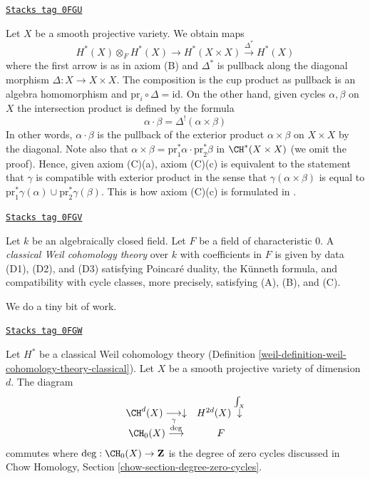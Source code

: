 \begin{remark}
\label{weil-remark-replace-cup-product-classical}
\href{https://stacks.math.columbia.edu/tag/0FGU}{\texttt{Stacks tag 0FGU}}

Let $X$ be a smooth projective variety. We obtain maps
$$
H^*(X) \otimes_F H^*(X) \longrightarrow H^*(X \times X)
\xrightarrow{\Delta^*} H^*(X)
$$
where the first arrow is as in axiom (B) and $\Delta^*$
is pullback along the diagonal morphism $\Delta : X \to X \times X$.
The composition is the cup product as pullback is an algebra homomorphism and
$\text{pr}_i \circ \Delta = \text{id}$.
On the other hand, given cycles $\alpha, \beta$ on $X$
the intersection product is defined by the formula
$$
\alpha \cdot \beta =
\Delta^!(\alpha \times \beta)
$$
In other words, $\alpha \cdot \beta$ is the pullback of the
exterior product $\alpha \times \beta$ on $X \times X$ by
the diagonal. Note also that
$\alpha \times \beta = \text{pr}_1^*\alpha \cdot \text{pr}_2^*\beta$
in $\CH^*(X \times X)$ (we omit the proof). Hence, given axiom (C)(a),
axiom (C)(c) is equivalent to the statement that $\gamma$ is
compatible with exterior product in the sense that
$\gamma(\alpha \times \beta)$ is equal to
$\text{pr}_1^*\gamma(\alpha) \cup \text{pr}_2^*\gamma(\beta)$.
This is how axiom (C)(c) is formulated in \cite{Kleiman-cycles}.
\end{remark}

\begin{definition}
\label{weil-definition-weil-cohomology-theory-classical}
\href{https://stacks.math.columbia.edu/tag/0FGV}{\texttt{Stacks tag 0FGV}}

Let $k$ be an algebraically closed field.
Let $F$ be a field of characteristic $0$.
A {\it classical Weil cohomology theory} over $k$ with coefficients in $F$
is given by data (D1), (D2), and (D3) satisfying
Poincar\'e duality, the K\"unneth formula, and compatibility
with cycle classes, more precisely, satisfying (A), (B), and (C).
\end{definition}

We do a tiny bit of work.

\begin{lemma}
\label{weil-lemma-degrees-cycles-classical}
\href{https://stacks.math.columbia.edu/tag/0FGW}{\texttt{Stacks tag 0FGW}}

Let $H^*$ be a classical Weil cohomology theory
(Definition \ref{weil-definition-weil-cohomology-theory-classical}).
Let $X$ be a smooth projective variety of dimension $d$. The diagram
$$
\begin{array}{cc}\CH^d(X) \underset{\gamma}{\longrightarrow}\downarrow & H^{2d}(X) \overset{\int_X}{\downarrow} \\ \CH_0(X) \overset{\deg}{\longrightarrow} & F\end{array}
$$
commutes where $\deg : \CH_0(X) \to \mathbf{Z}$ is the degree of
zero cycles discussed in Chow Homology, Section
\ref{chow-section-degree-zero-cycles}.
\end{lemma}

